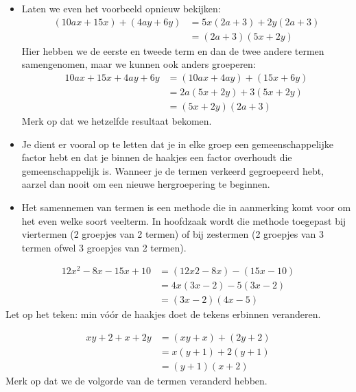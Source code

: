 \documentclass[12pt]{article}
\begin{document}
\begin{itemize}
  \item Laten we even het voorbeeld opnieuw bekijken:
  \begin{align*}
    (10ax + 15x) + (4ay + 6y)	&= 5x (2a + 3) + 2y (2a + 3)\\
		                          &= (2a + 3) (5x + 2y)
  \end{align*}
  Hier hebben we de eerste en tweede term en dan de twee andere termen samengenomen, maar we kunnen ook anders groeperen:
  \begin{align*}
  10ax + 15x + 4ay + 6y	&= (10ax + 4ay) + (15x + 6y)\\
                        &= 2a (5x + 2y) + 3 (5x + 2y)\\
                        &= (5x + 2y) (2a + 3)
  \end{align*}
  Merk op dat we hetzelfde resultaat bekomen.
  \item Je dient er vooral op te letten dat je in elke groep een gemeenschappelijke factor hebt en dat je binnen de haakjes een factor overhoudt die gemeenschappelijk is. Wanneer je de termen verkeerd gegroepeerd hebt, aarzel dan nooit om een nieuwe hergroepering te beginnen.
  \item Het samennemen van termen is een methode die in aanmerking komt voor om het even welke soort veelterm. In hoofdzaak wordt die methode toegepast bij viertermen (2 groepjes van 2 termen) of bij zestermen (2 groepjes van 3 termen ofwel 3 groepjes van 2 termen).
\end{itemize}

\begin{voorbeeld}
\begin{align*}
12x^2 - 8x - 15x + 10	&= (12x2 - 8x) - (15x - 10)\\
                      &= 4x (3x - 2) - 5 (3x - 2)\\
                      &= (3x - 2) (4x - 5)
\end{align*}
Let op het teken: min vóór de haakjes doet de tekens erbinnen veranderen.
\end{voorbeeld}

\begin{voorbeeld}
\begin{align*}
xy + 2 + x + 2y	&= (xy + x) + (2y + 2)\\
                &= x (y + 1) + 2 (y + 1)\\
                &= (y + 1) (x + 2)
\end{align*}
Merk op dat we de volgorde van de termen veranderd hebben.
\end{voorbeeld}
\end{document}
